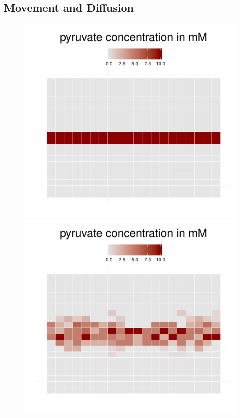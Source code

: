 \subsection{Movement and Diffusion}
\begin{figure}[h]
  \centering
  \begin{minipage}[t]{0.3\textwidth}
    \includegraphics[width=\textwidth]{diff1.pdf}
  \end{minipage}
  \begin{minipage}[t]{0.3\textwidth}
    \includegraphics[width=\textwidth]{diff2.pdf}

\end{minipage}
\end{figure}
